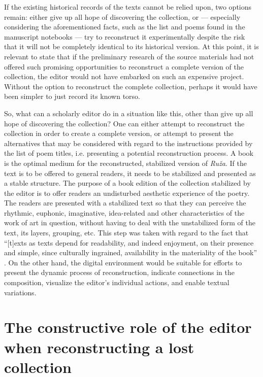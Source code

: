 \documentclass{article}
\begin{document}
If the existing historical records of the texts cannot be relied upon, two
options remain: either give up all hope of discovering the collection,
or –– especially considering the aforementioned facts, such as the list
and poems found in the manuscript notebooks –– try to reconstruct it
experimentally despite the risk that it will not be completely identical
to its historical version. At this point, it is relevant to state that
if the preliminary research of the source materials had not offered such
promising opportunities to reconstruct a complete version of the
collection, the editor would not have embarked on such an expensive
project. Without the option to reconstruct the complete collection,
perhaps it would have been simpler to just record its known torso.

So, what can a scholarly editor do in a situation like this, other than
give up all hope of discovering the collection? One can either attempt
to reconstruct the collection in order to create a complete version, or
attempt to present the alternatives that may be considered with regard
to the instructions provided by the list of poem titles, i.e. presenting
a potential reconstruction process. A book is the optimal medium for the
reconstructed, stabilized version of \emph{Ruža}. If the text is to be
offered to general readers, it needs to be stabilized and presented as
a stable structure. The purpose of a book edition of the collection
stabilized by the editor is to offer readers an undisturbed aesthetic
experience of the poetry. The readers are presented with a stabilized
text so that they can perceive the rhythmic, euphonic, imaginative,
idea-related and other characteristics of the work of art in question,
without having to deal with the unstabilized form of the text, its
layers, grouping, etc. This step was taken with regard to the fact that
``{[}t{]}exts as texts depend for readability, and indeed enjoyment, on
their presence and simple, since culturally ingrained, availability in
the materiality of the book'' \citep[XIV]{gabler_foreword_2016}. On the other hand, the
digital environment would be suitable for efforts to present the dynamic
process of reconstruction, indicate connections in the composition,
visualize the editor's individual actions, and enable textual variations.

\section{The constructive role of the editor when reconstructing a lost
collection}
\end{document}
